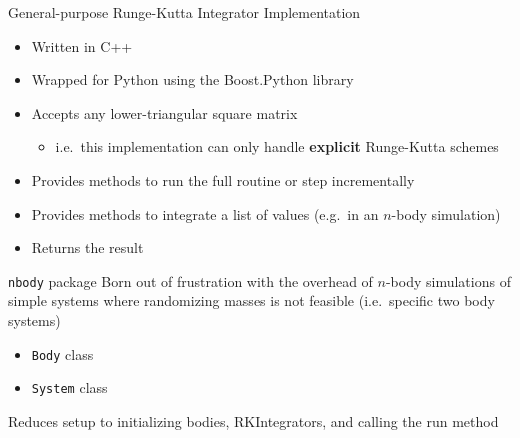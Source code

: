 \documentclass{beamer}
\begin{document}
\begin{frame}{General-purpose Runge-Kutta Integrator Implementation}
    \begin{itemize}
        \item Written in C++
        \item Wrapped for Python using the Boost.Python library
        \item Accepts any lower-triangular square matrix
            \begin{itemize}
                \item i.e.\ this implementation can only handle \textbf{explicit}
                    Runge-Kutta schemes
            \end{itemize}
        \item Provides methods to run the full routine or step incrementally
        \item Provides methods to integrate a list of values (e.g.\ in an
            $n$-body simulation)
        \item Returns the result
    \end{itemize}
\end{frame}

\begin{frame}{\texttt{nbody} package}
    Born out of frustration with the overhead of $n$-body simulations of simple
    systems where randomizing masses is not feasible (i.e.\ specific two body
    systems)
    \begin{itemize}
        \item \texttt{Body} class
        \item \texttt{System} class
    \end{itemize}

    \alert{Reduces setup to initializing bodies, RKIntegrators, and calling the
    run method}
\end{frame}
\end{document}
